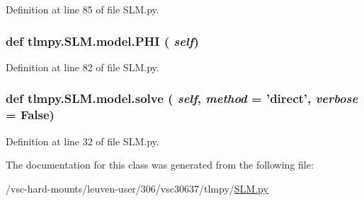 Definition at line 85 of file SLM.py.\hypertarget{classtlmpy_1_1SLM_1_1model_ab5b55ee660a1e2c24e2c6cd0f5626ab5}{
\subsubsection[{PHI}]{\setlength{\rightskip}{0pt plus 5cm}def tlmpy.SLM.model.PHI ( {\em self})}}
\label{classtlmpy_1_1SLM_1_1model_ab5b55ee660a1e2c24e2c6cd0f5626ab5}


Definition at line 82 of file SLM.py.\hypertarget{classtlmpy_1_1SLM_1_1model_a24ec46c380f32d1e5578fe8ffcb2c336}{
\subsubsection[{solve}]{\setlength{\rightskip}{0pt plus 5cm}def tlmpy.SLM.model.solve ( {\em self}, \/   {\em method} = {\ttfamily 'direct'}, \/   {\em verbose} = {\ttfamily False})}}
\label{classtlmpy_1_1SLM_1_1model_a24ec46c380f32d1e5578fe8ffcb2c336}


Definition at line 32 of file SLM.py.

The documentation for this class was generated from the following file:\begin{DoxyCompactItemize}
\item 
/vsc-\/hard-\/mounts/leuven-\/user/306/vsc30637/tlmpy/\hyperlink{SLM_8py}{SLM.py}\end{DoxyCompactItemize}
